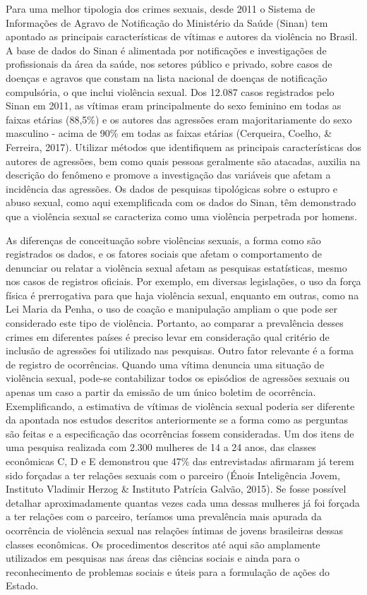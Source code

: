 Para uma melhor tipologia dos crimes sexuais, desde 2011 o Sistema de Informações de Agravo de Notificação do Ministério da Saúde (Sinan) tem apontado as principais características de vítimas e autores da violência no Brasil. A base de dados do Sinan é alimentada por notificações e investigações de profissionais da área da saúde, nos setores público e privado, sobre casos de doenças e agravos que constam na lista nacional de doenças de notificação compulsória, o que inclui violência sexual. Dos 12.087 casos registrados pelo Sinan em 2011, as vítimas eram principalmente do sexo feminino em todas as faixas etárias (88,5\%) e os autores das agressões eram majoritariamente do sexo masculino - acima de 90\% em todas as faixas etárias (Cerqueira, Coelho, \& Ferreira, 2017). Utilizar métodos que identifiquem as principais características dos autores de agressões, bem como quais pessoas geralmente são atacadas, auxilia na descrição do fenômeno e promove a investigação das variáveis que afetam a incidência das agressões. Os dados de pesquisas tipológicas sobre o estupro e abuso sexual, como aqui exemplificada com os dados do Sinan, têm demonstrado que a violência sexual se caracteriza como uma violência perpetrada por homens.

As diferenças de conceituação sobre violências sexuais, a forma como são registrados os dados, e os fatores sociais que afetam o comportamento de denunciar ou relatar a violência sexual afetam as pesquisas estatísticas, mesmo nos casos de registros oficiais. Por exemplo, em diversas legislações, o uso da força física é prerrogativa para que haja violência sexual, enquanto em outras, como na Lei Maria da Penha, o uso de coação e manipulação ampliam o que pode ser considerado este tipo de violência. Portanto, ao comparar a prevalência desses crimes em diferentes países é preciso levar em consideração qual critério de inclusão de agressões foi utilizado nas pesquisas. Outro fator relevante é a forma de registro de ocorrências. Quando uma vítima denuncia uma situação de violência sexual, pode-se contabilizar todos os episódios de agressões sexuais ou apenas um caso a partir da emissão de um único boletim de ocorrência. Exemplificando, a estimativa de vítimas de violência sexual poderia ser diferente da apontada nos estudos descritos anteriormente se a forma como as perguntas são feitas e a especificação das ocorrências fossem consideradas. Um dos itens de uma pesquisa realizada com 2.300 mulheres de 14 a 24 anos, das classes econômicas C, D e E demonstrou que 47\% das entrevistadas afirmaram já terem sido forçadas a ter relações sexuais com o parceiro (Énois Inteligência Jovem, Instituto Vladimir Herzog \& Instituto Patrícia Galvão, 2015). Se fosse possível detalhar aproximadamente quantas vezes cada uma dessas mulheres já foi forçada a ter relações com o parceiro, teríamos uma prevalência mais apurada da ocorrência de violência sexual nas relações íntimas de jovens brasileiras dessas classes econômicas. Os procedimentos descritos até aqui são amplamente utilizados em pesquisas nas áreas das ciências sociais e ainda para o reconhecimento de problemas sociais e úteis para a formulação de ações do Estado. 

